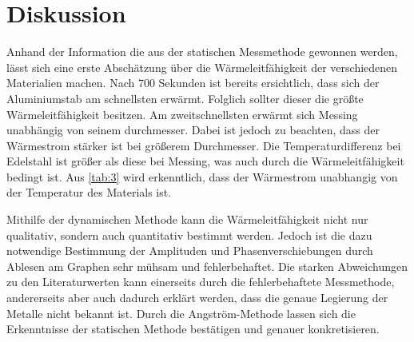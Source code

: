 \section{Diskussion}
\label{sec:Diskussion}
Anhand der Information die aus der statischen Messmethode gewonnen werden, lässt sich eine erste Abschätzung über die Wärmeleitfähigkeit der verschiedenen Materialien machen.
Nach 700 Sekunden ist bereits ersichtlich, dass sich der Aluminiumstab am schnellsten erwärmt.
Folglich sollter dieser die größte Wärmeleitfähigkeit besitzen.
Am zweitschnellsten erwärmt sich Messing unabhängig von seinem durchmesser.
Dabei ist jedoch zu beachten, dass der Wärmestrom stärker ist bei größerem Durchmesser.
Die Temperaturdifferenz bei Edelstahl ist größer als diese bei Messing, was auch durch die Wärmeleitfähigkeit bedingt ist.
Aus \ref{tab:3} wird erkenntlich, dass der Wärmestrom unabhangig von der Temperatur des Materials ist.

Mithilfe der dynamischen Methode kann die Wärmeleitfähigkeit nicht nur qualitativ, sondern auch quantitativ bestimmt werden.
Jedoch ist die dazu notwendige Bestimmung der Amplituden und Phasenverschiebungen durch Ablesen am Graphen sehr mühsam und fehlerbehaftet.
Die starken Abweichungen zu den Literaturwerten kann einerseits durch die fehlerbehaftete Messmethode,
andererseits aber auch dadurch erklärt werden, dass die genaue Legierung der Metalle nicht bekannt ist.
Durch die Angström-Methode lassen sich die Erkenntnisse der statischen Methode bestätigen und genauer konkretisieren.
